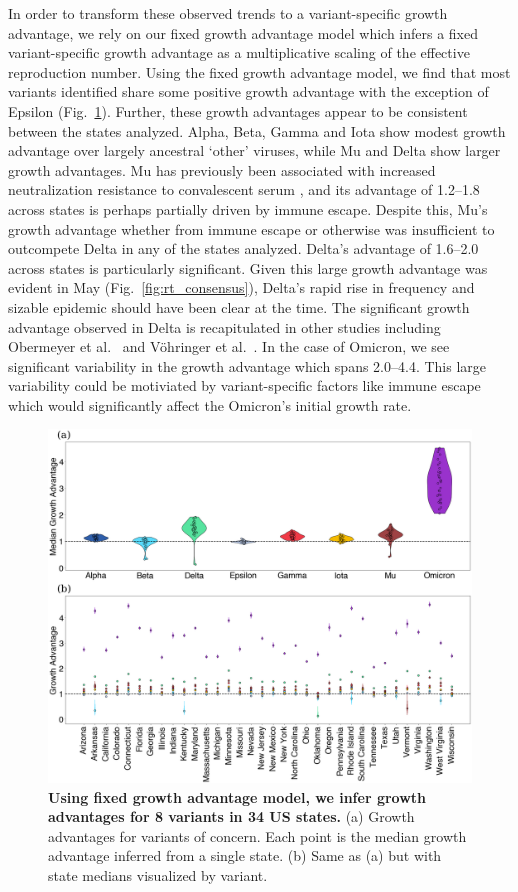 \documentclass[11pt,oneside,letterpaper]{article}
\begin{document}
In order to transform these observed trends to a variant-specific growth advantage, we rely on our fixed growth advantage model which infers a fixed variant-specific growth advantage as a multiplicative scaling of the effective reproduction number.
Using the fixed growth advantage model, we find that most variants identified share some positive growth advantage with the exception of Epsilon (Fig.\ \ref{fig:growth_advantages}).
Further, these growth advantages appear to be consistent between the states analyzed.
Alpha, Beta, Gamma and Iota show modest growth advantage over largely ancestral `other' viruses, while Mu and Delta show larger growth advantages.
Mu has previously been associated with increased neutralization resistance to convalescent serum \cite{Uriu2021}, and its advantage of 1.2--1.8 across states is perhaps partially driven by immune escape.
Despite this, Mu's growth advantage whether from immune escape or otherwise was insufficient to outcompete Delta in any of the states analyzed.
Delta's advantage of 1.6--2.0 across states is particularly significant.
Given this large growth advantage was evident in May (Fig.\ \ref{fig:rt_consensus}), Delta's rapid rise in frequency and sizable epidemic should have been clear at the time.
The significant growth advantage observed in Delta is recapitulated in other studies including Obermeyer et al.\ \cite{Obermeyer2021} and V\"ohringer et al.\ \cite{vohringer2021genomic}.
In the case of Omicron, we see significant variability in the growth advantage which spans 2.0--4.4.
This large variability could be motiviated by variant-specific factors like immune escape which would significantly affect the Omicron's initial growth rate.

\begin{figure}[t]
  \centering
  \includegraphics[width=\linewidth]{figs/growth_advantages.png}
  \caption{\textbf{Using fixed growth advantage model, we infer growth advantages for 8 variants in 34 US states.}
  (a) Growth advantages for variants of concern. Each point is the median growth advantage inferred from a single state.
  (b) Same as (a) but with state medians visualized by variant.}
  \label{fig:growth_advantages}
\end{figure}
\end{document}
